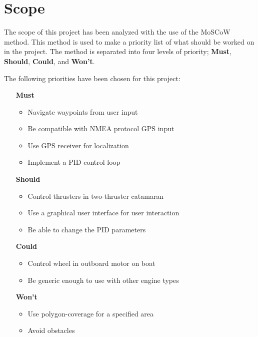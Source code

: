 \newpage
\chapter{Scope}
The scope of this project has been analyzed with the use of the MoSCoW method\cite{moscow}. This method is used to make a priority list of what should be worked on in the project. The method is separated into four levels of priority; \textbf{Must}, \textbf{Should}, \textbf{Could}, and \textbf{Won't}.

\noindent The following priorities have been chosen for this project:
\begin{itemize}
	\item[\textbf{Must}]
		\begin{itemize}
			\item Navigate waypoints from user input
			\item Be compatible with NMEA protocol GPS input
			\item Use GPS receiver for localization
			\item Implement a PID control loop
		\end{itemize}
	\item[\textbf{Should}]
		\begin{itemize}
			\item Control thrusters in two-thruster catamaran
			\item Use a graphical user interface for user interaction
			\item Be able to change the PID parameters
		\end{itemize}
	\item[\textbf{Could}] 
		\begin{itemize}
			\item Control wheel in outboard motor on boat
			\item Be generic enough to use with other engine types
		\end{itemize}
	\item[\textbf{Won't}]
		\begin{itemize}
			\item Use polygon-coverage for a specified area
			\item Avoid obstacles
		\end{itemize}
\end{itemize}